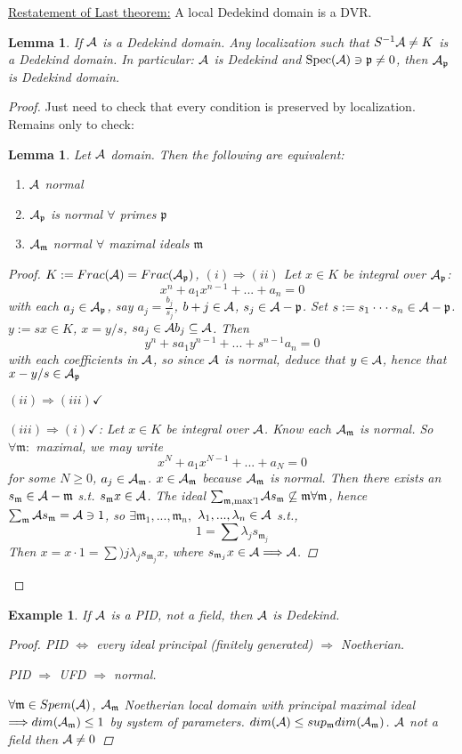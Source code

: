 \documentclass[11pt]{article}
\newtheorem{lemma}[thm]{Lemma}
\newtheorem{ex}[thm]{Example}
\newcommand{\scm}{{\mathfrak m}}
\newcommand{\scp}{{\mathfrak p}}
\newcommand{\cala}{{\cal A}}
\newcommand{\Lrta}{\Longrightarrow}
\newcommand{\Llrta}{\Longleftrightarrow}
\begin{document}
\underline{Restatement of Last theorem:} A local Dedekind domain is a DVR. 
\begin{lemma}If $\cala$ is a Dedekind domain.
Any localization such that $S^{-1}\cala\neq K$ is a Dedekind domain. In particular: $\cala$ is Dedekind and $\text{Spec}(\cala)\ni\scp\neq 0$, then $\cala_\scp$ is Dedekind domain.
\end{lemma} 
\begin{proof}
Just need to check that every condition is preserved by localization. Remains only to check:
\begin{lemma}
Let $\cala$ domain. Then the following are equivalent:
\begin{enumerate}[label=(\roman*)]
\item $\cala$ normal
\item $\cala_\scp$ is normal $\forall$ primes $\scp$
\item $\cala_\scm$ normal $\forall$ maximal ideals $\scm$
\end{enumerate}
\begin{proof}
$K:= Frac(\cala)=Frac(\cala_\scp)$,
$(i)\Lrta (ii)$ Let $x\in K$ be integral over $\cala_\scp$: 
$$
x^n+a_1 x^{n-1}+...+a_n=0
$$
with each $a_j\in\cala_\scp$, say $a_j=\frac{b_j}{s_j}$, $b+j\in \cala$, $s_j\in\cala-\scp$.
Set $s:=s_1\cdot\cdot\cdot s_n\in\cala-\scp$. $y:=sx\in K$, $x=y/s$, $sa_j\in\cala b_j\subseteq \cala$.
Then 
$$
y^n+s a_1 y^{n-1}+...+s^{n-1}a_n
=0
$$
with each coefficients in $\cala$, so since $\cala$ is normal, deduce that $y\in\cala$, hence that $x-y/s\in\cala_\scp$

$(ii)\Lrta (iii)\checkmark$

$(iii)\Lrta (i)\checkmark$: Let $x\in K$ be integral over $\cala$. Know each $\cala_\scm$ is normal. So $\forall \scm:$ maximal, we may write 
$$
x^{N}+a_1x^{N-1}+...+a_{N}=0
$$
for some $N\geq 0$, $a_{j}\in\cala_\scm$. $x\in\cala_\scm$ because $\cala_\scm$ is normal. Then there exists an $s_\scm\in\cala-\scm$ s.t. $s_\scm x\in\cala$. The ideal $\sum_{\scm,\text{max'l}}\cala s_\scm\not\subseteq \scm\forall\scm$, hence $\sum_{\scm}\cala s_\scm=\cala\ni 1$, so $\exists \scm_1,...,\scm_n,$ $\lambda_1,...,\lambda_n\in \cala$ s.t.,
$$
1=\sum\lambda_js_{\scm_j}
$$
Then $x=x\cdot 1=\sum)j\lambda_j s_{\scm_j}x$, where $s_{\scm_j}x\in\cala\Lrta \cala$.
\end{proof}
\end{lemma}
\end{proof}

\begin{ex}
If $\cala$ is a PID, not a field, then $\cala$ is Dedekind.
\begin{proof}
PID $\Llrta$ every ideal principal (finitely generated) $\Lrta $ Noetherian.

PID $\Lrta $ UFD $\Lrta$ normal.

$\forall\scm\in Spem(\cala)$, $\cala_\scm$ Noetherian local domain with principal maximal ideal $\Lrta dim(\cala_\scm)\leq 1$ by system of parameters.
$dim(\cala)\leq sup_\scm dim(\cala_\scm)$. $\cala$ not a field then $\cala\neq 0$ 
\end{proof}
\end{ex}
\end{document}
